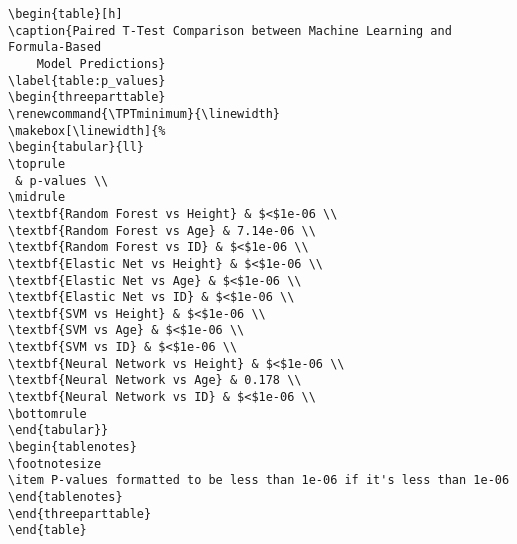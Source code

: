 \documentclass[11pt]{article}
\begin{document}
\begin{Verbatim}[tabsize=4]
\begin{table}[h]
\caption{Paired T-Test Comparison between Machine Learning and Formula-Based
	Model Predictions}
\label{table:p_values}
\begin{threeparttable}
\renewcommand{\TPTminimum}{\linewidth}
\makebox[\linewidth]{%
\begin{tabular}{ll}
\toprule
 & p-values \\
\midrule
\textbf{Random Forest vs Height} & $<$1e-06 \\
\textbf{Random Forest vs Age} & 7.14e-06 \\
\textbf{Random Forest vs ID} & $<$1e-06 \\
\textbf{Elastic Net vs Height} & $<$1e-06 \\
\textbf{Elastic Net vs Age} & $<$1e-06 \\
\textbf{Elastic Net vs ID} & $<$1e-06 \\
\textbf{SVM vs Height} & $<$1e-06 \\
\textbf{SVM vs Age} & $<$1e-06 \\
\textbf{SVM vs ID} & $<$1e-06 \\
\textbf{Neural Network vs Height} & $<$1e-06 \\
\textbf{Neural Network vs Age} & 0.178 \\
\textbf{Neural Network vs ID} & $<$1e-06 \\
\bottomrule
\end{tabular}}
\begin{tablenotes}
\footnotesize
\item P-values formatted to be less than 1e-06 if it's less than 1e-06
\end{tablenotes}
\end{threeparttable}
\end{table}

\end{Verbatim}
\end{document}
